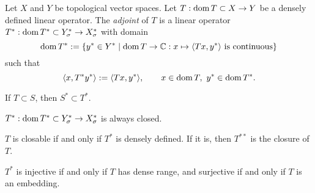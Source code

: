 \documentclass{../../large}
\begin{document}
\begin{prb}
Let $X$ and $Y$ be topological vector spaces.
Let $T:\operatorname{dom} T\subset X\to Y$ be a densely defined linear operator.
The \emph{adjoint} of $T$ is a linear operator $T^*:\operatorname{dom} T^*\subset Y^*_\sigma\to X^*_\sigma$ with domain
\[\operatorname{dom} T^*:=\{y^*\in Y^*\mid \operatorname{dom} T\to\mathbb{C}:x\mapsto\langle Tx,y^*\rangle\text{ is continuous}\}\]
such that
\[\langle x,T^*y^*\rangle:=\langle Tx,y^*\rangle,\qquad x\in\operatorname{dom} T,\ y^*\in\operatorname{dom} T^*.\]
\begin{parts}
\item If $T\subset S$, then $S^*\subset T^*$.
\item $T^*:\operatorname{dom} T^*\subset Y^*_\sigma\to X^*_\sigma$ is always closed.
\item $T$ is closable if and only if $T^*$ is densely defined. If it is, then $T^{**}$ is the closure of $T$.
\item $T^*$ is injective if and only if $T$ has dense range, and surjective if and only if $T$ is an embedding.
\end{parts}
\end{prb}
\end{document}
